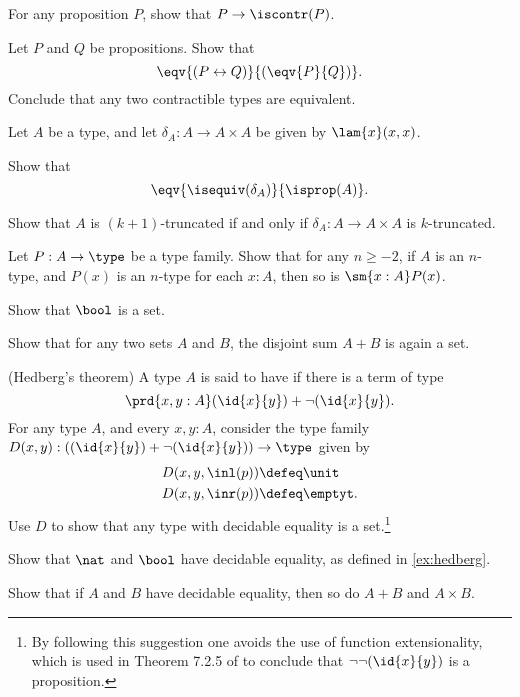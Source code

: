 \begin{exercises}
\item For any proposition $P$, show that $P\to\iscontr(P)$.
\item Let $P$ and $Q$ be propositions. Show that
\begin{equation*}
\eqv{(P\leftrightarrow Q)}{(\eqv{P}{Q})}.
\end{equation*}
Conclude that any two contractible types are equivalent.
\item Let $A$ be a type, and let $\delta_A:A\to A\times A$ be given by $\lam{x}(x,x)$. 
\begin{subexenum}
\item Show that
\begin{equation*}
\eqv{\isequiv(\delta_A)}{\isprop(A)}.
\end{equation*}
\item Show that $A$ is $(k+1)$-truncated if and only if $\delta_A:A\to A\times A$ is $k$-truncated.
\end{subexenum}
\item Let $P:A\to\type$ be a type family. Show that for any $n\geq-2$, if $A$ is an $n$-type, and $P(x)$ is an $n$-type for each $x:A$, then so is $\sm{x:A}P(x)$. 
\item Show that $\bool$ is a set.
\item Show that for any two sets $A$ and $B$, the disjoint sum $A+B$ is again a set.
\item \label{ex:hedberg}(Hedberg's theorem) A type $A$ is said to have  if there is a term of type
\begin{equation*}
\prd{x,y:A} (\id{x}{y})+\neg(\id{x}{y}).
\end{equation*}
For any type $A$, and every $x,y:A$, consider the type family $D(x,y):((\id{x}{y})+\neg(\id{x}{y}))\to\type$ given by
\begin{align*}
D(x,y,\inl(p)) & \defeq \unit \\
D(x,y,\inr(p)) & \defeq \emptyt.
\end{align*}
Use $D$ to show that any type with decidable equality is a set.\footnote{By following this suggestion one avoids the use of function extensionality, which is used in Theorem 7.2.5 of \cite{hottbook} to conclude that $\neg\neg(\id{x}{y})$ is a proposition.}
\item Show that $\nat$ and $\bool$ have decidable equality, as defined in \autoref{ex:hedberg}.
\item Show that if $A$ and $B$ have decidable equality, then so do $A+B$ and $A\times B$.

\end{exercises}
